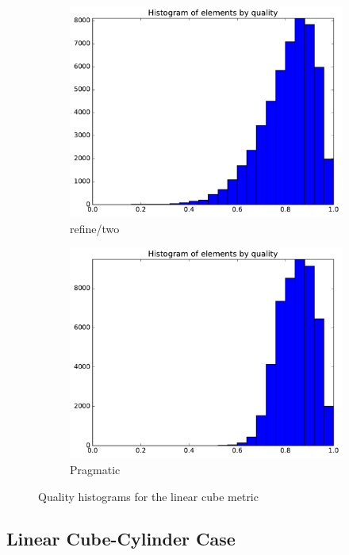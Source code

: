 \documentclass[3p,times,procedia,number]{elsarticle}
\begin{document}
\begin{figure}
\begin{subfigure}{.4\textwidth}
\includegraphics[width=\textwidth]{refine-two-cube-linear-quality.pdf}
\caption{refine/two}
\end{subfigure}
\begin{subfigure}{.4\textwidth}
\centering
\includegraphics[width=\textwidth]{pragmatic-cube-linear-quality.pdf}
\caption{Pragmatic}
\end{subfigure}
\caption{Quality histograms for the linear cube metric}
\label{fig:cube-linear-qualities}
\end{figure}

\subsection{Linear Cube-Cylinder Case}
\end{document}
